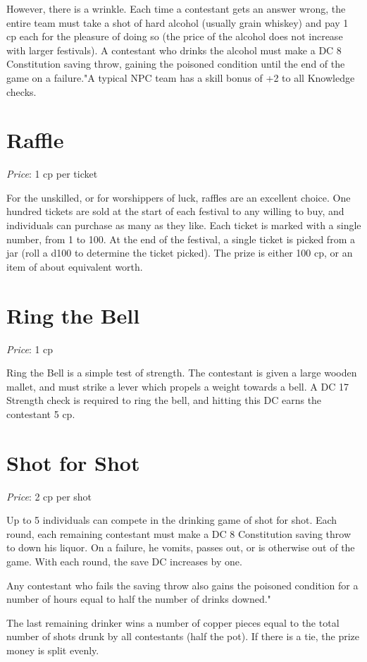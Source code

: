 \documentclass[10pt,a4paper,twoside,bg=print,twocolumn,openany,nodeprecatedcode]{dndbook}
\begin{document}
However, there is a wrinkle. Each time a contestant gets an answer wrong, the entire team must take a shot of hard alcohol (usually grain whiskey) and pay 1 cp each for the pleasure of doing so (the price of the alcohol does not increase with larger festivals). A contestant who drinks the alcohol must make a DC 8 Constitution saving throw, gaining the poisoned condition until the end of the game on a failure."A typical NPC team has a skill bonus of +2 to all Knowledge checks.

\section{Raffle}
\textit{Price}: 1 cp per ticket

For the unskilled, or for worshippers of luck, raffles are an excellent choice. One hundred tickets are sold at the start of each festival to any willing to buy, and individuals can purchase as many as they like. Each ticket is marked with a single number, from 1 to 100. At the end of the festival, a single ticket is picked from a jar (roll a d100 to determine the ticket picked). The prize is either 100 cp, or an item of about equivalent worth.

\section{Ring the Bell}
\textit{Price}: 1 cp

Ring the Bell is a simple test of strength. The contestant is given a large wooden mallet, and must strike a lever which propels a weight towards a bell. A DC 17 Strength check is required to ring the bell, and hitting this DC earns the contestant 5 cp.

\section{Shot for Shot}
\textit{Price}: 2 cp per shot

Up to 5 individuals can compete in the drinking game of shot for shot. Each round, each remaining contestant must make a DC 8 Constitution saving throw to down his liquor. On a failure, he vomits, passes out, or is otherwise out of the game. With each round, the save DC increases by one.

Any contestant who fails the saving throw also gains the poisoned condition for a number of hours equal to half the number of drinks downed."

The last remaining drinker wins a number of copper pieces equal to the total number of shots drunk by all contestants (half the pot). If there is a tie, the prize money is split evenly.
\end{document}
